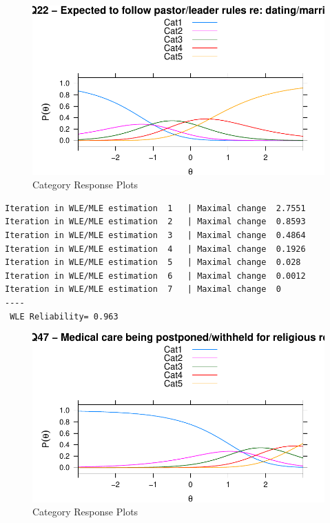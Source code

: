 \documentclass[
  letterpaper,
]{article}
\begin{document}
\begin{figure}

{\centering \includegraphics{./results_files/figure-pdf/fig-RM-plot1-1.pdf}

}

\caption{\label{fig-RM-plot1}Category Response Plots}

\end{figure}

\begin{verbatim}
Iteration in WLE/MLE estimation  1   | Maximal change  2.7551 
Iteration in WLE/MLE estimation  2   | Maximal change  0.8593 
Iteration in WLE/MLE estimation  3   | Maximal change  0.4864 
Iteration in WLE/MLE estimation  4   | Maximal change  0.1926 
Iteration in WLE/MLE estimation  5   | Maximal change  0.028 
Iteration in WLE/MLE estimation  6   | Maximal change  0.0012 
Iteration in WLE/MLE estimation  7   | Maximal change  0 
----
 WLE Reliability= 0.963 
\end{verbatim}

\begin{figure}

{\centering \includegraphics{./results_files/figure-pdf/fig-RM-plot2-1.pdf}

}

\caption{\label{fig-RM-plot2}Category Response Plots}

\end{figure}
\end{document}
